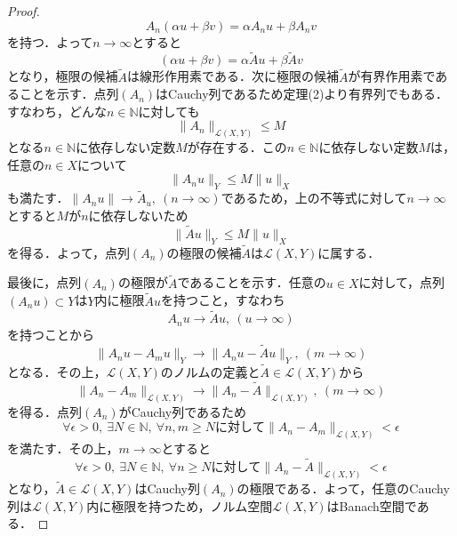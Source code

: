 \documentclass[11pt,a4paper]{jsarticle}
\theoremstyle{definition}
\begin{document}
\begin{proof}
  \begin{equation*}
    A_n(\alpha u+\beta v) = \alpha A_n u + \beta A_n v
  \end{equation*}
  を持つ．よって$n\rightarrow \infty$とすると
  \begin{equation*}
    (\alpha u+\beta v)=\alpha \tilde{A} u + \beta \tilde{A} v
  \end{equation*}
  となり，極限の候補$\tilde{A}$は線形作用素である．次に極限の候補$\tilde{A}$が有界作用素であることを示す．点列$(A_n)$はCauchy列であるため定理(2)より有界列でもある．すなわち，どんな$n\in \mathbb{N}$に対しても
  \begin{equation*}
    \|A_n\|_{\mathcal{L}(X,Y)} \leq M
  \end{equation*}
  となる$n\in\mathbb{N}$に依存しない定数$M$が存在する．この$n\in\mathbb{N}$に依存しない定数$M$は，任意の$n\in X$について
  \begin{equation*}
    \|A_nu\|_Y \leq M\|u\|_X
  \end{equation*}
  も満たす．$\|A_nu\|\rightarrow\tilde{A}_u,\ (n\rightarrow \infty)$であるため，上の不等式に対して$n\rightarrow \infty$とすると$M$が$n$に依存しないため
  \begin{equation*}
    \|\tilde{A}u\|_Y \leq M\|u\|_X
  \end{equation*}
  を得る．よって，点列$(A_n)$の極限の候補$\tilde{A}$は$\mathcal{L}(X,Y)$に属する．

  最後に，点列$(A_n)$の極限が$\tilde{A}$であることを示す．任意の$u\in X$に対して，点列$(A_nu)\subset Y$は$Y$内に極限$\tilde{A}u$を持つこと，すなわち
  \begin{equation*}
    A_nu\rightarrow \tilde{A}u,\ (u\rightarrow \infty)
  \end{equation*}
  を持つことから
  \begin{equation*}
    \|A_n u- A_m u\|_Y\rightarrow \|A_n u-\tilde{A}u\|_Y,\ (m\rightarrow \infty)
  \end{equation*}
  となる．その上，$\mathcal{L}(X,Y)$のノルムの定義と$\tilde{A}\in\mathcal{L}(X,Y)$から
  \begin{equation*}
    \|A_n-A_m\|_{\mathcal{L}(X,Y)}\rightarrow\|A_n-\tilde{A}\|_{\mathcal{L}(X,Y)},\ (m\rightarrow \infty)
  \end{equation*}
  を得る．点列$(A_n)$がCauchy列であるため
  \begin{equation*}
    \forall \epsilon >0,\ \exists N\in\mathbb{N},\ \forall n,m\geq N に対して\|A_n-A_m\|_{\mathcal{L}(X,Y)}<\epsilon
  \end{equation*}
  を満たす．その上，$m\rightarrow \infty$とすると
  \begin{equation*}
    \forall \epsilon >0,\ \exists N\in\mathbb{N},\ \forall n\geq N に対して\|A_n-\tilde{A}\|_{\mathcal{L}(X,Y)}<\epsilon
  \end{equation*}
  となり，$\tilde{A}\in\mathcal{L}(X,Y)$はCauchy列$(A_n)$の極限である．よって，任意のCauchy列は$\mathcal{L}(X,Y)$内に極限を持つため，ノルム空間$\mathcal{L}(X,Y)$はBanach空間である．
\end{proof}
\end{document}

